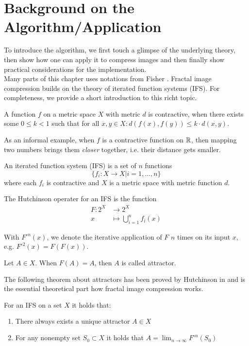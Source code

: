 \section{Background on the Algorithm/Application}\label{sec:background}
To introduce the algorithm, we first touch a glimpse of the underlying theory, then show how one can apply
it to compress images and then finally show practical considerations for the implementation. \\
Many parts of this chapter uses notations from Fisher \cite{fisher2012}.
Fractal image compression builds on the theory of iterated function systems (IFS). For completeness,
we provide a short introduction to this richt topic.
\begin{definition}
    A function $f$ on a metric space $X$ with metric $d$ is contractive, when there exists some $0 \leq k < 1$
    such that for all $x,y \in X: d(f(x), f(y)) \leq k \cdot d(x,y)$.
\end{definition}
As an informal example, when $f$ is a contractive function on $\mathbb{R}$, then mapping two numbers brings them \textit{closer} together,
i.e. their distance gets smaller.
\begin{definition}
    An iterated function system (IFS) is a set of $n$ functions $$\{f_i:X \to X | i=1,...,n\}$$
    where each $f_i$ is contractive and $X$ is a metric space with metric function $d$.
\end{definition}
\begin{definition}
    The Hutchinson operater for an IFS is the function
    \begin{align*}
        F \colon 2^X &\to 2^X\\
        x &\mapsto \bigcup_{i=1}^n f_i(x)
    \end{align*}
\end{definition}
With $F^{\circ n}(x)$, we denote the iterative application of $F$ $n$ times on its input $x$, e.g. $F^{\circ 2}(x) = F(F(x))$.
\begin{definition}
    Let $A \in X$. When $F(A)=A$, then $A$ is called attractor.
\end{definition}
The following theorem about attractors has been proved by Hutchinson in \cite{hutchinson1981fractals} and is
the essential theoretical part how fractal image compression works.
\begin{theorem}\label{theorem-fixpoint}
    For an IFS on a set $X$ it holds that:
    \begin{enumerate}
        \item There always exists a unique attractor $A \in X$
        \item For any nonempty set $S_0 \subset X$ it holds that $A = \lim_{n \to \infty} F^{\circ n}(S_0)$
    \end{enumerate}
\end{theorem}
